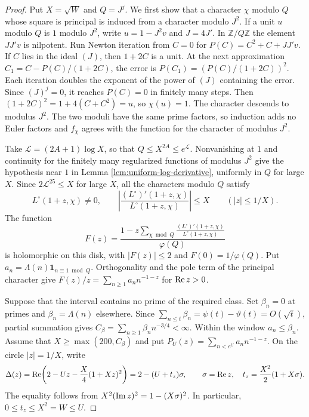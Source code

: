 \begin{proof}
Put \(X=\sqrt W\) and \(Q=J^j\).
We first show that a character \(\chi\) modulo \(Q\) whose square is
principal is induced from a character modulo \(J^2\).
If a unit \(u\) modulo \(Q\) is \(1\) modulo \(J^2\), write
\(u=1-J^2v\) and \(J=4J'\). In \(\mathbb Z/Q\mathbb Z\) the element \(JJ'v\)
is nilpotent. Run Newton iteration from \(C=0\) for \(P(C)=C^2+C+JJ'v\).
If \(C\) lies in the ideal \((J)\), then \(1+2C\) is a unit. At the next
approximation \(C_1=C-P(C)/(1+2C)\), the error is
\(P(C_1)=(P(C)/(1+2C))^2\). Each iteration doubles the exponent of the power
of \((J)\) containing the error. Since \((J)^j=0\), it reaches \(P(C)=0\)
in finitely many steps. Then \((1+2C)^2=1+4(C+C^2)=u\), so \(\chi(u)=1\).
The character descends to modulus \(J^2\). The two moduli have the same prime
factors, so induction adds no Euler factors and \(f_\chi\) agrees with
the function for the character of modulus \(J^2\).

Take \(\mathcal L=(2A+1)\log X\), so that \(Q\le X^{2A}\le e^\mathcal L\).
Nonvanishing at \(1\) and continuity for the finitely many regularized
functions of modulus \(J^2\) give the hypothesis near \(1\) in
Lemma \ref{lem:uniform-log-derivative}, uniformly in \(Q\) for large \(X\).
Since \(2\mathcal L^{25}\le X\) for large \(X\), all the characters modulo
\(Q\) satisfy
\[
 L^\circ(1+z,\chi)\ne0,\qquad
 \left|\frac{(L^\circ)'(1+z,\chi)}{L^\circ(1+z,\chi)}\right|\le X
 \qquad (|z|\le1/X).
\]
The function
\[
 F(z)=\frac{1-z\displaystyle\sum_{\chi\bmod Q}
                   \frac{(L^\circ)'(1+z,\chi)}{L^\circ(1+z,\chi)}}{\varphi(Q)}
\]
is holomorphic on this disk, with \(|F(z)|\le2\) and \(F(0)=1/\varphi(Q)\).
Put \(a_n=\Lambda(n)\mathbf 1_{n\equiv1\bmod Q}\). Orthogonality and the pole
term of the principal character give \(F(z)/z=\sum_{n\ge1} a_n n^{-1-z}\)
for \(\operatorname{Re} z>0\).

Suppose that the interval contains no prime of the required class.
Set \(\beta_n=0\) at primes and \(\beta_n=\Lambda(n)\) elsewhere.
Since \(\sum_{n\le t}\beta_n=\psi(t)-\vartheta(t)=O(\sqrt{t})\),
partial summation gives \(C_\beta=\sum_{n\ge1}\beta_n n^{-3/4}<\infty\).
Within the window \(a_n\le\beta_n\).
Assume that \(X\ge\max(200,C_\beta)\) and put
\(P_U(z)=\sum_{n<e^U}a_n n^{-1-z}\). On the circle \(|z|=1/X\), write
\[
 \Delta(z)=\operatorname{Re}\!\left(2-Uz-\frac X4(1+Xz)^2\right)
       =2-(U+t_z)\sigma,\qquad
 \sigma=\operatorname{Re} z,\quad t_z=\frac{X^2}{2}(1+X\sigma).
\]
The equality follows from \(X^2(\operatorname{Im} z)^2=1-(X\sigma)^2\).
In particular, \(0\le t_z\le X^2=W\le U\).


\end{proof}
